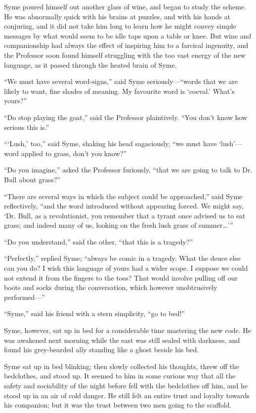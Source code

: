 Syme poured himself out another glass of wine, and began to study the scheme. He was abnormally quick with his brains at puzzles, and with his hands at conjuring, and it did not take him long to learn how he might convey simple messages by what would seem to be idle taps upon a table or knee. But wine and companionship had always the effect of inspiring him to a farcical ingenuity, and the Professor soon found himself struggling with the too vast energy of the new language, as it passed through the heated brain of Syme.

“We must have several word-signs,” said Syme seriously⁠—“words that we are likely to want, fine shades of meaning. My favourite word is ‘coeval.’ What’s yours?”

“Do stop playing the goat,” said the Professor plaintively. “You don’t know how serious this is.”

“ ‘Lush,’ too,” said Syme, shaking his head sagaciously, “we must have ‘lush’⁠—word applied to grass, don’t you know?”

“Do you imagine,” asked the Professor furiously, “that we are going to talk to Dr. Bull about grass?”

“There are several ways in which the subject could be approached,” said Syme reflectively, “and the word introduced without appearing forced. We might say, ‘Dr. Bull, as a revolutionist, you remember that a tyrant once advised us to eat grass; and indeed many of us, looking on the fresh lush grass of summer⁠ ⁠…’ ”

“Do you understand,” said the other, “that this is a tragedy?”

“Perfectly,” replied Syme; “always be comic in a tragedy. What the deuce else can you do? I wish this language of yours had a wider scope. I suppose we could not extend it from the fingers to the toes? That would involve pulling off our boots and socks during the conversation, which however unobtrusively performed⁠—”

“Syme,” said his friend with a stern simplicity, “go to bed!”

Syme, however, sat up in bed for a considerable time mastering the new code. He was awakened next morning while the east was still sealed with darkness, and found his grey-bearded ally standing like a ghost beside his bed.

Syme sat up in bed blinking; then slowly collected his thoughts, threw off the bedclothes, and stood up. It seemed to him in some curious way that all the safety and sociability of the night before fell with the bedclothes off him, and he stood up in an air of cold danger. He still felt an entire trust and loyalty towards his companion; but it was the trust between two men going to the scaffold.

